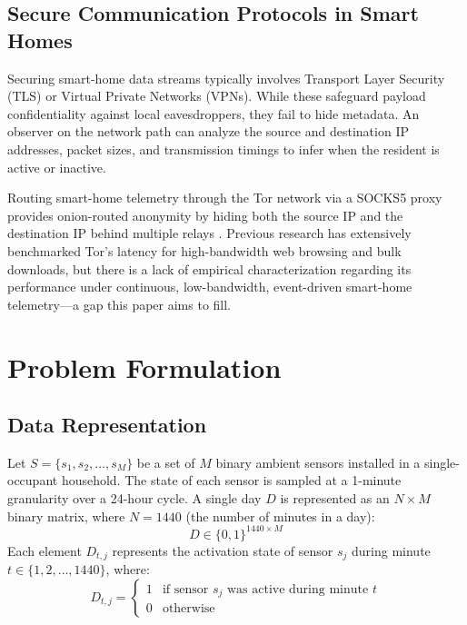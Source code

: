 \documentclass[conference]{IEEEtran}
\begin{document}
\subsection{Secure Communication Protocols in Smart Homes}
Securing smart-home data streams typically involves Transport Layer Security (TLS) or Virtual Private Networks (VPNs). While these safeguard payload confidentiality against local eavesdroppers, they fail to hide metadata. An observer on the network path can analyze the source and destination IP addresses, packet sizes, and transmission timings to infer when the resident is active or inactive.

Routing smart-home telemetry through the Tor network via a SOCKS5 proxy provides onion-routed anonymity by hiding both the source IP and the destination IP behind multiple relays \cite{tor original}. Previous research has extensively benchmarked Tor's latency for high-bandwidth web browsing and bulk downloads, but there is a lack of empirical characterization regarding its performance under continuous, low-bandwidth, event-driven smart-home telemetry---a gap this paper aims to fill.

\section{Problem Formulation}

\subsection{Data Representation}
Let $S = \{s_1, s_2, \dots, s_M\}$ be a set of $M$ binary ambient sensors installed in a single-occupant household. The state of each sensor is sampled at a 1-minute granularity over a 24-hour cycle.
A single day $D$ is represented as an $N \times M$ binary matrix, where $N = 1440$ (the number of minutes in a day):
\begin{equation}
D \in \{0, 1\}^{1440 \times M}
\end{equation}
Each element $D_{t, j}$ represents the activation state of sensor $s_j$ during minute $t \in \{1, 2, \dots, 1440\}$, where:
\begin{equation}
D_{t, j} = \begin{cases} 
      1 & \text{if sensor } s_j \text{ was active during minute } t \\
      0 & \text{otherwise}
   \end{cases}
\end{equation}
\end{document}
